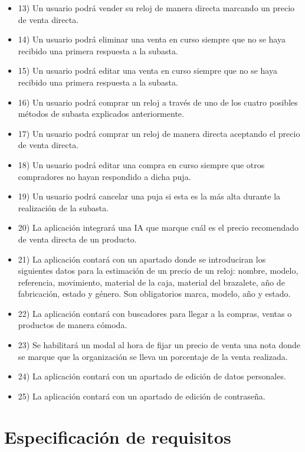 \begin{itemize}
	\item 13) Un usuario podrá vender su reloj de manera directa marcando un precio de venta directa.	
	\item 14) Un usuario podrá eliminar una venta en curso siempre que no se haya recibido una primera respuesta a la subasta.
	\item 15) Un usuario podrá editar una venta en curso siempre que no se haya recibido una primera respuesta a la subasta.
	\item 16) Un usuario podrá comprar un reloj a través de uno de los cuatro posibles métodos de subasta explicados anteriormente.
	\item 17) Un usuario podrá comprar un reloj de manera directa aceptando el precio de venta directa.	
	\item 18) Un usuario podrá editar una compra en curso siempre que otros compradores no hayan respondido a dicha puja.
	\item 19) Un usuario podrá cancelar una puja si esta es la más alta durante la realización de la subasta.
	\item 20) La aplicación integrará una IA que marque cuál es el precio recomendado de venta directa de un producto.
	\item 21) La aplicación contará con un apartado donde se introduciran los siguientes datos para la estimación de un precio de un reloj: nombre, modelo, referencia, movimiento, material de la caja, material del brazalete, año de fabricación, estado y género. Son obligatorios marca, modelo, año y estado.
	\item 22) La aplicación contará con buscadores para llegar a la compras, ventas o productos de manera cómoda.
	\item 23) Se habilitará un modal al hora de fijar un precio de venta una nota donde se marque que la organización se lleva un porcentaje de la venta realizada.
	\item 24) La aplicación contará con un apartado de edición de datos personales.
	\item 25) La aplicación contará con un apartado de edición de contraseña.
\end{itemize}

\section{Especificación de requisitos}


